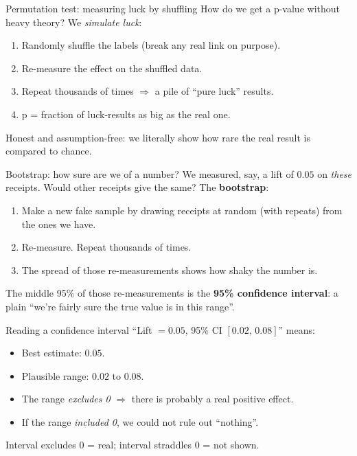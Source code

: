 \documentclass[aspectratio=169]{beamer}
\newcommand{\keybox}[1]{\begin{center}\colorbox{grey!15}{\parbox{0.92\linewidth}{\centering #1}}\end{center}}
\begin{document}
\begin{frame}{Permutation test: measuring luck by shuffling}
How do we get a p-value without heavy theory? We \emph{simulate luck}:
\begin{enumerate}
\item Randomly shuffle the labels (break any real link on purpose).
\item Re-measure the effect on the shuffled data.
\item Repeat thousands of times $\Rightarrow$ a pile of ``pure luck''
results.
\item p = fraction of luck-results as big as the real one.
\end{enumerate}
\keybox{Honest and assumption-free: we literally show how rare the
real result is compared to chance.}
\end{frame}

\begin{frame}{Bootstrap: how sure are we of a number?}
We measured, say, a lift of $0.05$ on \emph{these} receipts. Would
other receipts give the same? The \textbf{bootstrap}:
\begin{enumerate}
\item Make a new fake sample by drawing receipts at random (with
repeats) from the ones we have.
\item Re-measure. Repeat thousands of times.
\item The spread of those re-measurements shows how shaky the number
is.
\end{enumerate}
\keybox{The middle 95\% of those re-measurements is the
\textbf{95\% confidence interval}: a plain ``we're fairly sure the
true value is in this range''.}
\end{frame}

\begin{frame}{Reading a confidence interval}
``Lift $=0.05$, 95\% CI $[0.02,\,0.08]$'' means:
\begin{itemize}
\item Best estimate: $0.05$.
\item Plausible range: $0.02$ to $0.08$.
\item The range \emph{excludes 0} $\Rightarrow$ there is probably a
real positive effect.
\item If the range \emph{included 0}, we could not rule out ``nothing''.
\end{itemize}
\keybox{Interval excludes 0 = real; interval straddles 0 = not shown.}
\end{frame}
\end{document}
